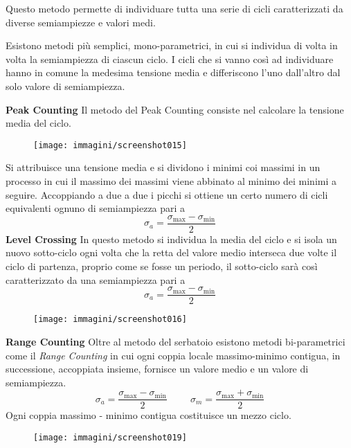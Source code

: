 \documentclass{article}
\begin{document}
		 \begin{adjustwidth}{2in}{}
		 
		 Questo metodo permette di individuare tutta una serie di cicli caratterizzati da diverse semiampiezze e valori medi. 
		  
		 Esistono metodi più semplici, mono-parametrici, in cui si individua di volta in volta la semiampiezza di ciascun ciclo. I cicli che si vanno così ad individuare hanno in comune la medesima tensione media e differiscono l'uno dall'altro dal solo valore di semiampiezza. \newline
		 
		 \textbf{Peak Counting}\newline
		  Il metodo del Peak Counting consiste nel calcolare la tensione media del ciclo.
		  
		  \begin{figure}[H]
		  	\centering
		  	\texttt{[image: immagini/screenshot015]}
		  	\label{fig:screenshot015}
		  \end{figure}
		  
		  
		  Si attribuisce una tensione media e si dividono i minimi coi massimi in un processo in cui il massimo dei massimi viene abbinato al minimo dei minimi a seguire.
		  Accoppiando a due a due i picchi si ottiene un certo numero di cicli equivalenti ognuno di semiampiezza pari a
		  \[\sigma_a = \dfrac{\sigma_{\max}-\sigma_{\min}}{2}\]
\newpage		  
		  \textbf{Level Crossing}\newline
		  In questo metodo si individua la media del ciclo e si isola un nuovo sotto-ciclo ogni volta che la retta del valore medio interseca due volte il ciclo di partenza, proprio come se fosse un periodo, il sotto-ciclo sarà così caratterizzato da una semiampiezza pari a
		  \[\sigma_a = \dfrac{\sigma_{\max}-\sigma_{\min}}{2}\]
		  \begin{figure}[H]
		  	\centering
		  	\texttt{[image: immagini/screenshot016]}
		  	\label{fig:screenshot016}
		  \end{figure}
		  
		  
		  \textbf{Range Counting}\newline
		  Oltre al metodo del serbatoio esistono metodi bi-parametrici come il \textit{Range Counting} in cui ogni coppia locale massimo-minimo contigua, in successione, accoppiata insieme, fornisce un valore medio e un valore di semiampiezza. 
		  \[\sigma_a = \dfrac{\sigma_{\max}-\sigma_{\min}}{2}\hspace{1cm} \sigma_m = \dfrac{\sigma_{\max}+\sigma_{\min}}{2}\]
		  Ogni coppia massimo - minimo contigua costituisce un mezzo ciclo. 
		  \begin{figure}[H]
		  	\centering
		  	\texttt{[image: immagini/screenshot019]}
		  	\label{fig:screenshot019}
		  \end{figure}
		  

\end{adjustwidth}
\end{document}
